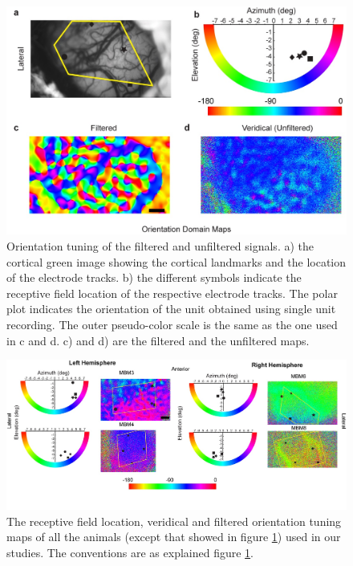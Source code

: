 							\begin{figure}[H]
								
								\includegraphics[width=\linewidth]{rb/figure1.jpg}
								\caption{Orientation tuning of the filtered and unfiltered signals. a) the cortical green image showing the cortical landmarks and the location of the electrode tracks. b) the different symbols indicate the receptive field location of the respective electrode tracks. The polar plot indicates the orientation of the unit obtained using single unit recording. The outer pseudo-color scale is the same as the one used in c and d. c) and d) are the filtered and the unfiltered maps.}
								\label{fig:rep}
							\end{figure}
			
			
			\begin{figure}[H]
				
				\includegraphics[width=\linewidth]{rb/figure2.jpg}
				\caption{The receptive field location, veridical and filtered orientation tuning maps of  all the animals (except that showed in figure \ref{fig:rep}) used in our studies. The conventions are as explained figure \ref{fig:rep}.}
				\label{fig:all}
			\end{figure}
							
